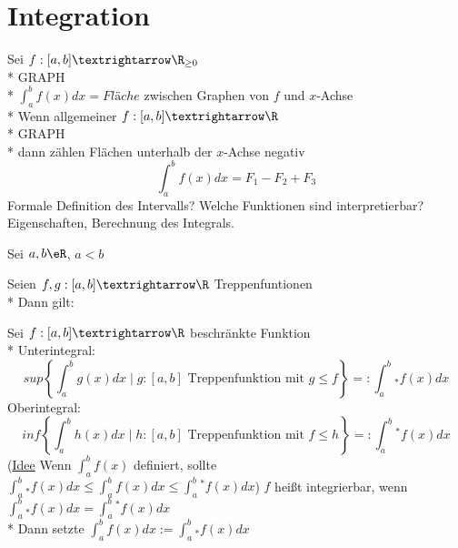 %
\chapter{Integration}
 Sei $f:[a,b]→\R_{\geq 0}$\\*
GRAPH\\*
$\int_a^b f(x)dx=Fläche$ zwischen Graphen von $f$ und $x$-Achse\\*
Wenn allgemeiner $f:[a,b]→\R$\\*
GRAPH\\*
dann zählen Flächen unterhalb der $x$-Achse negativ
$$\int_a^b f(x)dx =F_1-F_2+F_3$$
Formale Definition des Intervalls? Welche Funktionen sind interpretierbar? Eigenschaften, Berechnung des Integrals.

Sei $a,b \eR$, $a<b$

Seien $f,g:[a,b]→\R$ Treppenfuntionen\\*
Dann gilt:

Sei $f:[a,b]→\R$ beschränkte Funktion\\*
Unterintegral:
$$sup \left\{\int_a^b g(x)dx\mid g:[a,b]\text{ Treppenfunktion mit }g\leq f\right\}=:\int_a^b{}_* f(x)dx$$
Oberintegral:
$$inf \left\{\int_a^b h(x)dx\mid h:[a,b]\text{ Treppenfunktion mit }f\leq h\right\}=:\int_a^b{}^* f(x)dx$$
(\ul{Idee} Wenn $\int_a^b f(x)$ definiert, sollte $ \int_a^b{}_* f(x)dx\leq \int_a^b f(x)dx \leq \int_a^b{}^* f(x)dx $)
$f$ heißt integrierbar, wenn $\int_a^b{}_* f(x)dx=\int_a^b{}^* f(x)dx$\\*
Dann setzte $\int_a^b f(x)dx:=\int_a^b{}_* f(x)dx$


